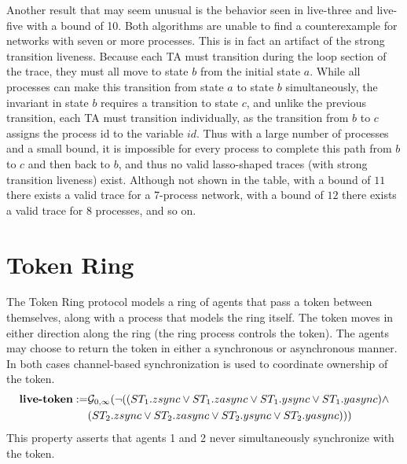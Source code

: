 \documentclass[a4paper,11pt]{report}
\theoremstyle{definition}
\begin{document}
Another result that may seem unusual is the behavior seen in live-three and
live-five with a bound of 10. Both algorithms are unable to find a
counterexample for networks with seven or more processes. This is in fact an
artifact of the strong transition liveness. Because each TA must transition
during the loop section of the trace, they must all move to state $b$ from the
initial state $a$. While all processes can make this transition from state $a$
to state $b$ simultaneously, the invariant in state $b$ requires a transition to
state $c$, and unlike the previous transition, each TA must transition
individually, as the transition from $b$ to $c$ assigns the process id to the
variable $id$. Thus with a large number of processes and a small bound, it is
impossible for every process to complete this path from $b$ to $c$ and then back
to $b$, and thus no valid lasso-shaped traces (with strong transition liveness)
exist. Although not shown in the table, with a bound of $11$ there exists a
valid trace for a 7-process network, with a bound of $12$ there exists a valid
trace for 8 processes, and so on.

\section{Token Ring}\label{evaluation-token}

The Token Ring protocol models a ring of agents that pass a token between
themselves, along with a process that models the ring itself. The token moves in
either direction along the ring (the ring process controls the token). The
agents may choose to return the token in either a synchronous or asynchronous
manner. In both cases channel-based synchronization is used to coordinate
ownership of the token.
\begin{align*}
  \text{\textbf{live-token}} := & \mathcal{G}_{{0,\infty}} (\neg ((ST_{1}.zsync \lor ST_{1}.zasync \lor ST_{1}.ysync \lor ST_{1}.yasync) \land \\
  & (ST_{2}.zsync \lor ST_{2}.zasync \lor ST_{2}.ysync \lor ST_{2}.yasync))) \\
\end{align*}
This property asserts that agents 1 and 2 never simultaneously synchronize with
the token.
\end{document}
